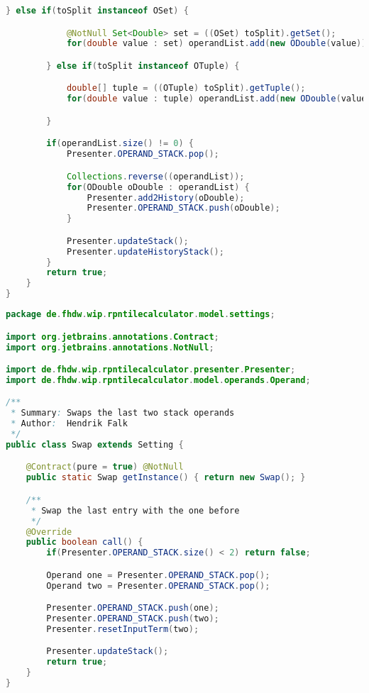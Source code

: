 \begin{lstlisting}[caption=Split (Falk),label=list:Split,language=Java]
        } else if(toSplit instanceof OSet) {

            @NotNull Set<Double> set = ((OSet) toSplit).getSet();
            for(double value : set) operandList.add(new ODouble(value));

        } else if(toSplit instanceof OTuple) {

            double[] tuple = ((OTuple) toSplit).getTuple();
            for(double value : tuple) operandList.add(new ODouble(value));

        }

        if(operandList.size() != 0) {
            Presenter.OPERAND_STACK.pop();

            Collections.reverse((operandList));
            for(ODouble oDouble : operandList) {
                Presenter.add2History(oDouble);
                Presenter.OPERAND_STACK.push(oDouble);
            }

            Presenter.updateStack();
            Presenter.updateHistoryStack();
        }
        return true;
    }
}
\end{lstlisting}    

\begin{lstlisting}[caption=Swap (Falk),label=list:Swap,language=Java]
package de.fhdw.wip.rpntilecalculator.model.settings;

import org.jetbrains.annotations.Contract;
import org.jetbrains.annotations.NotNull;

import de.fhdw.wip.rpntilecalculator.presenter.Presenter;
import de.fhdw.wip.rpntilecalculator.model.operands.Operand;

/**
 * Summary: Swaps the last two stack operands
 * Author:  Hendrik Falk
 */
public class Swap extends Setting {

    @Contract(pure = true) @NotNull
    public static Swap getInstance() { return new Swap(); }

    /**
     * Swap the last entry with the one before
     */
    @Override
    public boolean call() {
        if(Presenter.OPERAND_STACK.size() < 2) return false;

        Operand one = Presenter.OPERAND_STACK.pop();
        Operand two = Presenter.OPERAND_STACK.pop();

        Presenter.OPERAND_STACK.push(one);
        Presenter.OPERAND_STACK.push(two);
        Presenter.resetInputTerm(two);

        Presenter.updateStack();
        return true;
    }
}

\end{lstlisting}    

